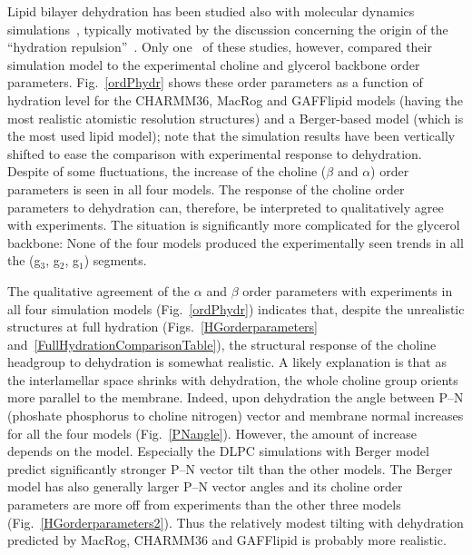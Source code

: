 \documentclass[journal=jacsat,manuscript=article]{achemso}
\begin{document}
Lipid bilayer dehydration has been studied also with molecular dynamics simulations~\cite{mashl01,pertsin05,pertsin07,eun09,eun10,schneck12},
typically motivated by the  discussion concerning the origin of the ``hydration repulsion''~\cite{israelachvili,israelachvili96,sparr11}.
Only one~\cite{mashl01} of these studies, however, compared their simulation model to the experimental choline and glycerol backbone
order parameters.
Fig.~\ref{ordPhydr} shows these order parameters as a function of hydration level for the CHARMM36, 
MacRog and GAFFlipid models (having the most realistic atomistic resolution structures) and a Berger-based model 
(which is the most used lipid model);
note that the simulation results have been vertically shifted to ease the comparison with experimental response to dehydration.
Despite of some fluctuations, the increase of the choline ($\beta$ and $\alpha$) order parameters is seen in all four
models. The response of the choline order parameters to dehydration can, therefore, be
interpreted to qualitatively agree with experiments.
The situation is significantly more complicated for the glycerol backbone: 
None of the four models produced the experimentally seen trends
in all the (g$_{3}$, g$_{2}$, g$_{1}$) segments.

The qualitative agreement of the $\alpha$ and $\beta$ order parameters with experiments in all four simulation models (Fig.~\ref{ordPhydr}) indicates that,
despite the unrealistic structures at full hydration (Figs.~\ref{HGorderparameters} and~\ref{FullHydrationComparisonTable}),
the structural response of the choline headgroup to dehydration is somewhat realistic.
A likely explanation is that as the interlamellar space shrinks with dehydration, the whole choline group
orients more parallel to the membrane.
Indeed, upon dehydration the angle between P--N (phoshate phosphorus to choline nitrogen) vector and membrane normal increases for
all the four models (Fig.~\ref{PNangle}). However,
the amount of increase depends on the model. Especially the DLPC simulations with Berger model
predict significantly stronger P--N vector tilt than the other models. The Berger model
has also generally larger P--N vector angles and its choline order parameters are more off from
experiments than the other three models (Fig.~\ref{HGorderparameters2}). Thus the relatively modest tilting with dehydration
predicted by MacRog, CHARMM36 and GAFFlipid is probably more realistic.
\end{document}
